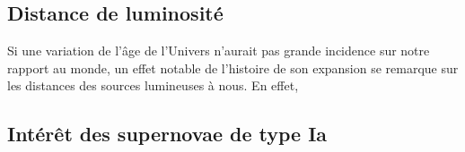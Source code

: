 \documentclass[../main/main.tex]{subfiles}
\begin{document}
\subsection{Distance de luminosité}\label{ssec:dl}

Si une variation de l'âge de l'Univers n'aurait pas grande incidence sur notre
rapport au monde, un effet notable de l'histoire de son expansion se remarque
sur les distances des sources lumineuses à nous. En effet,

\subsection{Intérêt des supernovae de type Ia}\label{ssec:intsne}

\newpage

\thispagestyle{plain}
\vfill
\minilof
\vfill
\minilot
\vfill


\shorthandoff{:}

\end{document}
